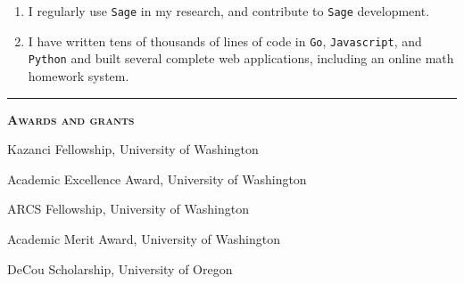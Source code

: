 \documentclass[12pt]{article}
\newcommand{\sectionheading}[1]
{
\bigskip %
\noindent
\hspace{-6.5mm}\textcolor{Gray}{\rule[.75mm]{21.5mm}{1mm}} %
\hspace{.2mm}	%
{\large{\textbf{\textsc{#1}}}} %
}
\newenvironment{date_section}
	{
	\vspace{-1ex}
	\leftmargini = 15ex
		\begin{itemize}[
			labelsep = *,
			labelwidth = 9ex,
			labelindent = 0ex,
			itemindent = !,
			font=\normalfont,
			align=parleft
		]{}
		\itemsep=-1.5mm
	}
	{\end{itemize}\vspace{-2ex}}
\newcommand{\yearmo}[2]{
	\item[
		{\makebox[1ex][r]{#1}}
		\hspace{1ex}
		{\makebox[1ex][l]{#2} }
		] }
\begin{document}
	\begin{enumerate}[label=$\bullet$, itemsep=-1mm, leftmargin=24mm]
		\item I regularly use {\tt Sage} in my research, and contribute to {\tt Sage} development.
		\item I have written tens of thousands of lines of code in {\tt Go}, {\tt Javascript}, and {\tt Python} and built several complete web applications, including an online math homework system.
	\end{enumerate}




	\sectionheading{Awards and grants}%
	
	\begin{date_section}
		\yearmo{}{2017}%
		Kazanci Fellowship, University of Washington
		\yearmo{}{2014}%
		Academic Excellence Award, University of Washington
		\yearmo{}{2013}%
		ARCS Fellowship, University of Washington
		\yearmo{}{2013}%
		Academic Merit Award, University of Washington
		\yearmo{}{2012}%
		DeCou Scholarship, University of Oregon
	\end{date_section}




%	
%
%		
%			
%			
%			
%			
%			
%		
\end{document}
